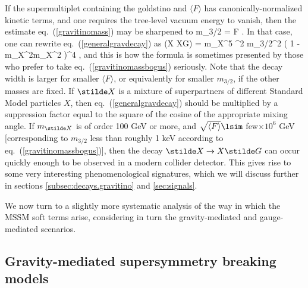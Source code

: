 If the supermultiplet containing the goldstino and $\langle F \rangle$
has canonically-normalized kinetic terms, and one requires the tree-level
vacuum energy
to vanish, then the estimate eq.~(\ref{gravitinomass}) may be sharpened to
\beq
m_{3/2} = {\langle F \rangle \over {} \MPlanck} .
\label{gravitinomassbogus}
\eeq
In that case, one can rewrite eq.~(\ref{generalgravdecay}) as
\beq
\Gamma(\stilde X \rightarrow X\stilde G) =
{m_{\stilde X}^5  \pi \MPlanck^2 m_{3/2}^2}
\left ( 1 - {m_X^2\over m_{\stilde X}^2} \right )^4 ,
\qquad\>\>{}
\label{specificgravdecay}
\eeq
and this is how the formula is sometimes presented by those who
prefer to take eq.~(\ref{gravitinomassbogus}) seriously.
Note that the decay width is
larger for smaller $\langle F \rangle$, or equivalently for smaller
$m_{3/2}$, if the other masses are fixed. 
If $\stilde X$ is a mixture
of superpartners of different Standard Model particles $X$, then
eq.~(\ref{generalgravdecay}) should be multiplied by a suppression
factor equal to the square of the cosine of the appropriate
mixing angle.
If $m_{\stilde X}$ is of order 100 GeV or more, and $\sqrt{
\langle F\rangle }
\lsim$ few$\times 10^6$ GeV [corresponding to $m_{3/2}$ less than
roughly 1 keV according to eq.~(\ref{gravitinomassbogus})],
then the decay $\stilde X \rightarrow
X \stilde G$ can occur quickly enough to be observed in a modern
collider detector. This 
gives rise to some very interesting phenomenological signatures,
which we will discuss further in sections
\ref{subsec:decays.gravitino} and \ref{sec:signals}.

We now turn to a slightly more systematic analysis of the
way in which the MSSM soft terms arise, considering in turn
the gravity-mediated and gauge-mediated scenarios.

\subsection{Gravity-mediated supersymmetry breaking
models}\label{subsec:origins.sugra}

